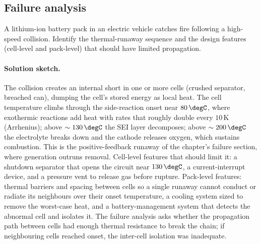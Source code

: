 \subsection*{Failure analysis}

\begin{exercise}
A lithium-ion battery pack in an electric vehicle catches fire
following a high-speed collision. Identify the thermal-runaway
sequence and the design features (cell-level and pack-level) that
should have limited propagation.
\paragraph{Solution sketch.} The collision creates an internal short in
one or more cells (crushed separator, breached can), dumping the cell's
stored energy as local heat. The cell temperature climbs through the
side-reaction onset near $80\,\degC$, where exothermic reactions add
heat with rates that roughly double every $10\,\si{\kelvin}$ (Arrhenius);
above $\sim 130\,\degC$ the SEI layer decomposes; above $\sim 200\,\degC$
the electrolyte breaks down and the cathode releases oxygen, which
sustains combustion. This is the positive-feedback runaway of the
chapter's failure section, where generation outruns removal. Cell-level
features that should limit it: a shutdown separator that opens the
circuit near $130\,\degC$, a current-interrupt device, and a pressure
vent to release gas before rupture. Pack-level features: thermal barriers
and spacing between cells so a single runaway cannot conduct or radiate
its neighbours over their onset temperature, a cooling system sized to
remove the worst-case heat, and a battery-management system that detects
the abnormal cell and isolates it. The failure analysis asks whether the
propagation path between cells had enough thermal resistance to break the
chain; if neighbouring cells reached onset, the inter-cell isolation was
inadequate.
\end{exercise}

